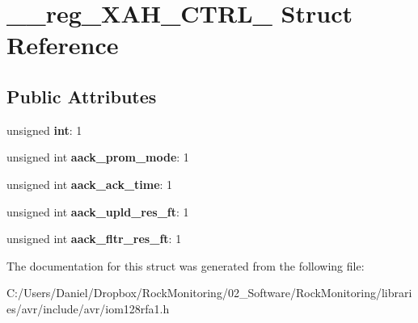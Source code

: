 \hypertarget{struct____reg___x_a_h___c_t_r_l__1}{}\section{\+\_\+\+\_\+reg\+\_\+\+X\+A\+H\+\_\+\+C\+T\+R\+L\+\_ Struct Reference}
\label{struct____reg___x_a_h___c_t_r_l__1}
\subsection*{Public Attributes}
\begin{DoxyCompactItemize}
\item 
unsigned {\bfseries int}\+: 1\hypertarget{struct____reg___x_a_h___c_t_r_l__1_af5d478f07c948ce807e801a224610aa1}{}\label{struct____reg___x_a_h___c_t_r_l__1_af5d478f07c948ce807e801a224610aa1}

\item 
unsigned int {\bfseries aack\+\_\+prom\+\_\+mode}\+: 1\hypertarget{struct____reg___x_a_h___c_t_r_l__1_abb295877613c862a615813a439f1b5af}{}\label{struct____reg___x_a_h___c_t_r_l__1_abb295877613c862a615813a439f1b5af}

\item 
unsigned int {\bfseries aack\+\_\+ack\+\_\+time}\+: 1\hypertarget{struct____reg___x_a_h___c_t_r_l__1_a236e41d1b3708c3eabbe4c63edf7a2a2}{}\label{struct____reg___x_a_h___c_t_r_l__1_a236e41d1b3708c3eabbe4c63edf7a2a2}

\item 
unsigned int {\bfseries aack\+\_\+upld\+\_\+res\+\_\+ft}\+: 1\hypertarget{struct____reg___x_a_h___c_t_r_l__1_a9b8210ccee5601449456aecd92114f2f}{}\label{struct____reg___x_a_h___c_t_r_l__1_a9b8210ccee5601449456aecd92114f2f}

\item 
unsigned int {\bfseries aack\+\_\+fltr\+\_\+res\+\_\+ft}\+: 1\hypertarget{struct____reg___x_a_h___c_t_r_l__1_ae661f6a6b818aeebad38dbc1143a217a}{}\label{struct____reg___x_a_h___c_t_r_l__1_ae661f6a6b818aeebad38dbc1143a217a}

\end{DoxyCompactItemize}


The documentation for this struct was generated from the following file\+:\begin{DoxyCompactItemize}
\item 
C\+:/\+Users/\+Daniel/\+Dropbox/\+Rock\+Monitoring/02\+\_\+\+Software/\+Rock\+Monitoring/libraries/avr/include/avr/iom128rfa1.\+h\end{DoxyCompactItemize}
